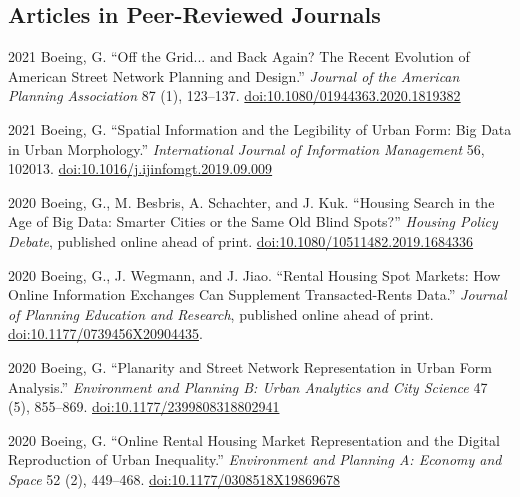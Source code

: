 \documentclass[12pt,letterpaper]{report}
\begin{document}
    \subsection*{Articles in Peer-Reviewed Journals}

    \begin{tablist}

        \item[2021] \tab Boeing, G. \enquote{Off the Grid... and Back Again? The Recent Evolution of American Street Network Planning and Design.} \textit{Journal of the American Planning Association} 87 (1), 123--137. \href{https://doi.org/10.1080/01944363.2020.1819382}{doi:10.1080/01944363.2020.1819382}

        \item[2021] \tab Boeing, G. \enquote{Spatial Information and the Legibility of Urban Form: Big Data in Urban Morphology.} \textit{International Journal of Information Management} 56, 102013. \href{https://doi.org/10.1016/j.ijinfomgt.2019.09.009}{doi:10.1016/j.ijinfomgt.2019.09.009}

        \item[2020] \tab Boeing, G., M. Besbris, A. Schachter, and J. Kuk. \enquote{Housing Search in the Age of Big Data: Smarter Cities or the Same Old Blind Spots?} \textit{Housing Policy Debate}, published online ahead of print. \href{https://doi.org/10.1080/10511482.2019.1684336}{doi:10.1080/10511482.2019.1684336}

        \item[2020] \tab Boeing, G., J. Wegmann, and J. Jiao. \enquote{Rental Housing Spot Markets: How Online Information Exchanges Can Supplement Transacted-Rents Data.} \textit{Journal of Planning Education and Research}, published online ahead of print. \href{https://doi.org/10.1177/0739456X20904435}{doi:10.1177/0739456X20904435}.

        \item[2020] \tab Boeing, G. \enquote{Planarity and Street Network Representation in Urban Form Analysis.} \textit{Environment and Planning B: Urban Analytics and City Science} 47 (5), 855--869. \href{https://doi.org/10.1177/2399808318802941}{doi:10.1177/2399808318802941}

        \item[2020] \tab Boeing, G. \enquote{Online Rental Housing Market Representation and the Digital Reproduction of Urban Inequality.} \textit{Environment and Planning A: Economy and Space} 52 (2), 449--468. \href{https://doi.org/10.1177/0308518X19869678}{doi:10.1177/0308518X19869678}


\end{tablist}
\end{document}
